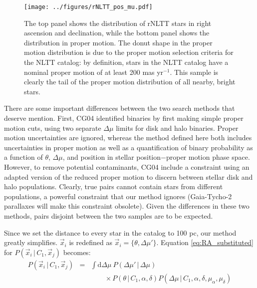\documentclass[usenatbib]{mnras}
\newcommand{\given}{\,|\,}
\newcommand{\dd}{\mathrm{d}}
\begin{document}
\begin{figure}
\begin{center}
\texttt{[image: ../figures/rNLTT\_pos\_mu.pdf]}
\caption{The top panel shows the distribution of rNLTT stars in right ascension and declination, while the bottom panel shows the distribution in proper motion. The donut shape in the proper motion distribution is due to the proper motion selection criteria for the NLTT catalog: by definition, stars in the NLTT catalog have a nominal proper motion of at least 200 mas yr$^{-1}$. This sample is clearly the tail of the proper motion distribution of all nearby, bright stars.}
\label{fig:rNLTT_pos_mu}
\end{center}
\end{figure}



There are some important differences between the two search methods that deserve mention. First, CG04 identified binaries by first making simple proper motion cuts, using two separate $\Delta \mu$ limits for disk and halo binaries. Proper motion uncertainties are ignored, whereas the method defined here both includes uncertainties in proper motion as well as a quantification of binary probability as a function of $\theta$, $\Delta \mu$, and position in stellar position$-$proper motion phase space. However, to remove potential contaminants, CG04 include a constraint using an adapted version of the reduced proper motion to discern between stellar disk and halo populations. 
Clearly, true pairs cannot contain stars from different populations, a powerful constraint that our method ignores (Gaia-Tycho-2 parallaxes will make this constraint obsolete). Given the differences in these two methods, pairs disjoint between the two samples are to be expected.



Since we set the distance to every star in the catalog to 100 pc, our method greatly simplifies. $\vec{x}_i$ is redefined as $\vec{x}_i = \{ \theta, \Delta \mu' \}$. Equation \ref{eq:RA_substituted} for $P(\vec{x}_i \given C_1, \vec{x}_j)$ becomes:
\begin{eqnarray}
P(\vec{x}_i \given C_1, \vec{x}_j) &=& \int \dd \Delta \mu\ P(\Delta \mu' \given \Delta \mu)\nonumber \\
& & \qquad \times P(\theta \given C_1, \alpha, \delta) P(\Delta \mu \given C_1, \alpha, \delta, \mu_{\alpha}, \mu_{\delta}) \nonumber \\
\label{eq:P_random_NLTT}
\end{eqnarray}
\end{document}

